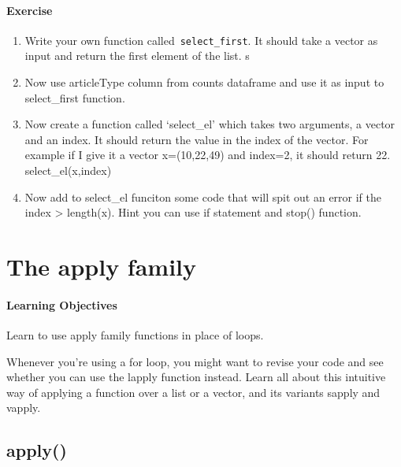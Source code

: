 \documentclass[
]{book}
\providecommand{\tightlist}{%
  \setlength{\itemsep}{0pt}\setlength{\parskip}{0pt}}
\begin{document}
\hypertarget{exercise-2}{%
\subsubsection*{Exercise}\label{exercise-2}}

\begin{enumerate}
\def\labelenumi{\arabic{enumi}.}
\tightlist
\item
  Write your own function called~\texttt{select\_first}. It should take a vector as input and return the first element of the list.
  s
\item
  Now use articleType column from counts dataframe and use it as input to select\_first function.
\item
  Now create a function called `select\_el' which takes two arguments, a vector and an index. It should return the value in the index of the vector. For example if I give it a vector x=(10,22,49) and index=2, it should return 22.
  select\_el(x,index)
\item
  Now add to select\_el funciton some code that will spit out an error if the index \textgreater{} length(x). Hint you can use if statement and stop() function.
\end{enumerate}

\hypertarget{the-apply-family}{%
\chapter{The apply family}\label{the-apply-family}}

\hypertarget{learning-objectives-3}{%
\subsubsection*{Learning Objectives}\label{learning-objectives-3}}

Learn to use apply family functions in place of loops.

Whenever you're using a for loop, you might want to revise your code and see whether you can use the lapply function instead. Learn all about this intuitive way of applying a function over a list or a vector, and its variants sapply and vapply.

\hypertarget{apply}{%
\section{apply()}\label{apply}}
\end{document}
